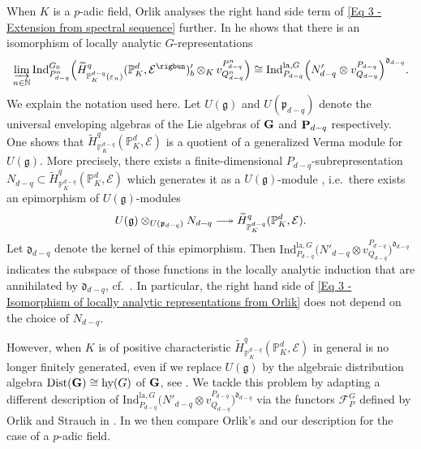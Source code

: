 \documentclass[a4paper, reqno, 10pt]{amsart}
\theoremstyle{definition}
\numberwithin{equation}{section}
\newcommand{\botimes}[1]{{\,\otimes_{#1}\,}}
\newcommand{\hy}{{\mathrm{hy}}}
\newcommand{\Ind}{{\mathrm{Ind}}}
\newcommand{\la}{{\mathrm{la}}}
\newcommand{\BN}{{\mathbb {N}}}
\newcommand{\BP}{{\mathbb {P}}}
\newcommand{\CE}{{\mathcal {E}}}
\newcommand{\CF}{{\mathcal {F}}}
\newcommand{\bG}{{\mathrm{\bf G}}}
\newcommand{\bP}{{\mathrm{\bf P}}}
\newcommand{\Fd}{{\mathfrak {d}}}
\newcommand{\Fg}{{\mathfrak {g}}}
\newcommand{\Fp}{{\mathfrak {p}}}
\begin{document}
When $K$ is a $p$-adic field, Orlik analyses the right hand side term of \eqref{Eq 3 - Extension from spectral sequence} further.
In \cite[p.\ 634]{Orlik08EquivVBDrinfeldUpHalfSp} he shows that there is an isomorphism of locally analytic $G$-representations
\begin{equation}\label{Eq 3 - Isomorphism of locally analytic representations from Orlik}
	\varinjlim_{n\in \BN} \Ind^{G_0}_{P^n_{d-q}} \Big( \widetilde{H}^q_{\BP_K^{d-q} (\varepsilon_n)} (\BP_K^d, \CE^\rigbun)'_b \botimes{K} v^{P^n_{d-q}}_{Q^n_{d-q}} \Big)
	\cong \Ind^{\la, G}_{P_{d-q}} \Big( N'_{d-q} \otimes v^{P_{d-q}}_{Q_{d-q}} \Big)^{\Fd_{d-q}} .
\end{equation}
We explain the notation used here.
Let $U(\Fg)$ and $U(\Fp_{d-q})$ denote the universal enveloping algebras of the Lie algebras of $\bG$ and $\bP_{d-q}$ respectively.
One shows that $\widetilde{H}^q_{\BP_K^{d-q}} (\BP_K^d, \CE)$ is a quotient of a generalized Verma module for $U(\Fg)$.
More precisely, there exists a finite-dimensional $P_{d-q}$-subrepresentation $N_{d-q} \subset \widetilde{H}^q_{\BP_K^{d-q}} (\BP_K^d, \CE)$ which generates it as a $U(\Fg)$-module \cite[Lemma 1.2.1]{Orlik08EquivVBDrinfeldUpHalfSp}, i.e.\ there exists an epimorphism of $U(\Fg)$-modules
\begin{equation*}
	U(\Fg) \otimes_{U(\Fp_{d-q})} N_{d-q} \relbar\joinrel\twoheadrightarrow \widetilde{H}^q_{\BP_K^{d-q}} (\BP_K^d, \CE) .
\end{equation*}
Let $\Fd_{d-q}$ denote the kernel of this epimorphism.
Then $\Ind^{\la, G}_{P_{d-q}} \big( N'_{d-q} \otimes v^{P_{d-q}}_{Q_{d-q}} \big)^{\Fd_{d-q}}$ indicates the subspace of those functions in the locally analytic induction that are annihilated by $\Fd_{d-q}$, cf.\ \cite[p.\ 607]{Orlik08EquivVBDrinfeldUpHalfSp}.
In particular, the right hand side of \eqref{Eq 3 - Isomorphism of locally analytic representations from Orlik} does not depend on the choice of $N_{d-q}$.


However, when $K$ is of positive characteristic $\widetilde{H}^q_{\BP_K^{d-q}} (\BP_K^d, \CE)$ in general is no longer finitely generated, even if we replace $U(\Fg)$ by the algebraic distribution algebra ${\rm Dist}(\bG) \cong \hy(G)$ of $\bG$, see \cite[Ch.\ 2.3]{Kuschkowitz16EquivVBRigidCohomDrinfeldUpHalfSpFF}.
We tackle this problem by adapting a different description of $\Ind^{\la, G}_{P_{d-q}} \big( N'_{d-q} \otimes v^{P_{d-q}}_{Q_{d-q}} \big)^{\Fd_{d-q}}$ via the functors $\CF_P^G$ defined by Orlik and Strauch in \cite{OrlikStrauch15JordanHoelderSerLocAnRep}.
In  we then compare Orlik's and our description for the case of a $p$-adic field.
\end{document}

